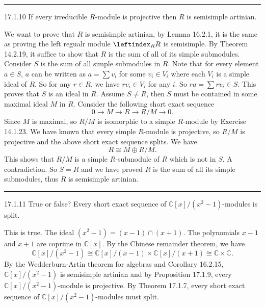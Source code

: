 \documentclass[a4paper, 12pt]{article}
\begin{document}
\noindent\rule{7in}{2.8pt}
\begin{problem}{17.1.10}
If every irreducible \(R\)-module is projective then \(R\) is semisimple artinian.
\end{problem}
\begin{solution}
We want to prove that \(R\) is semisimple artinian, by Lemma 16.2.1, it is the same as proving the left regualr module \(\leftindex_R R\) is semisimple. By Theorem 14.2.19, it suffice to show that \(R\) is the sum of all of 
its simple submodules. Consider \(S\) is the sum of all simple submodules in \(R\). Note that for every element \(a\in S\), \(a\) can be written as \(a=\sum v_i\) for some \(v_i\in V_i\) where each \(V_i\) is a simple ideal of \(R\). So for 
any \(r\in R\), we have \(rv_i\in V_i\) for any \(i\). So \(ra=\sum rv_i\in S\). This proves that \(S\) is an ideal in \(R\). Assume \(S\neq R\), then \(S\) must be contained in some maximal ideal \(M\) in \(R\). Consider the following short exact sequence 
\[0\rightarrow M\rightarrow R\rightarrow R/M\rightarrow 0.\]
Since \(M\) is maximal, so \(R/M\) is isomorphic to a simple \(R\)-module by Exercise 14.1.23. We have known that every simple \(R\)-module is projective, so \(R/M\) is projective and the above short exact sequence splits. We have 
\[R\cong M\oplus R/M.\]
This shows that \(R/M\) is a simple \(R\)-submodule of \(R\) which is not in \(S\). A contradiction. So \(S=R\) and we have proved \(R\) is the sum of all its simple submodules, thus \(R\) is semisimple artinian.
\end{solution}

\noindent\rule{7in}{2.8pt}
\begin{problem}{17.1.11}
True or false? Every short exact sequence of \(\mathbb{C}[x]/(x^2-1)\)-modules is split.
\end{problem}
\begin{solution}
This is true. The ideal \((x^2-1)=(x-1)\cap (x+1)\). The polynomials \(x-1\) and \(x+1\) are coprime in \(\mathbb{C}[x]\). By the Chinese remainder theorem, we have 
\[\mathbb{C}[x]/(x^2-1)\cong \mathbb{C}[x]/(x-1)\times \mathbb{C}[x]/(x+1)\cong \mathbb{C}\times \mathbb{C}.\]
By the Wedderburn-Artin theorem for algebras and Corollary 16.2.15, \(\mathbb{C}[x]/(x^2-1)\) is semisimple artinian and by Proposition 17.1.9, every \(\mathbb{C}[x]/(x^2-1)\)-module is projective. By Theorem 17.1.7, every short exact sequence of \(\mathbb{C}[x]/(x^2-1)\)-modules must split.
\end{solution}
\end{document}
